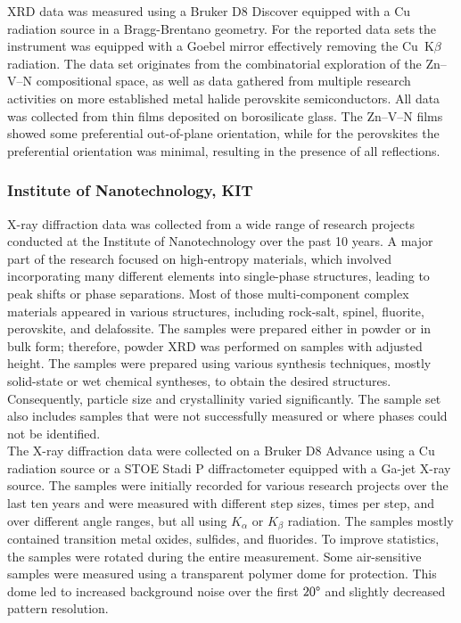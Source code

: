 XRD data was measured using a Bruker D8 Discover equipped with a Cu radiation source in a Bragg-Brentano geometry. For the reported data sets the instrument was equipped with a Goebel mirror effectively removing the Cu~K$\beta$ radiation. The data set originates from the combinatorial exploration of the Zn–V–N compositional space, as well as data gathered from multiple research activities on more established metal halide perovskite semiconductors. All data was collected from thin films deposited on borosilicate glass. The Zn–V–N films showed some preferential out-of-plane orientation, while for the perovskites the preferential orientation was minimal, resulting in the presence of all reflections. \\

\subsubsection*{Institute of Nanotechnology, KIT}

X-ray diffraction data was collected from a wide range of research projects conducted at the Institute of Nanotechnology over the past 10 years. A major part of the research focused on high-entropy materials, which involved incorporating many different elements into single-phase structures, leading to peak shifts or phase separations. Most of those multi-component complex materials appeared in various structures, including rock-salt, spinel, fluorite, perovskite, and delafossite. The samples were prepared either in powder or in bulk form; therefore, powder XRD was performed on samples with adjusted height. The samples were prepared using various synthesis techniques, mostly solid-state or wet chemical syntheses, to obtain the desired structures. Consequently, particle size and crystallinity varied significantly. The sample set also includes samples that were not successfully measured or where phases could not be identified. \\

The X-ray diffraction data were collected on a Bruker D8 Advance using a Cu radiation source or a STOE Stadi P diffractometer equipped with a Ga-jet X-ray source. The samples were initially recorded for various research projects over the last ten years and were measured with different step sizes, times per step, and over different angle ranges, but all using  $K_\alpha$ or  $K_\beta$ radiation. The samples mostly contained transition metal oxides, sulfides, and fluorides. To improve statistics, the samples were rotated during the entire measurement. Some air-sensitive samples were measured using a transparent polymer dome for protection. This dome led to increased background noise over the first $20\degree$ and slightly decreased pattern resolution. \\ 

